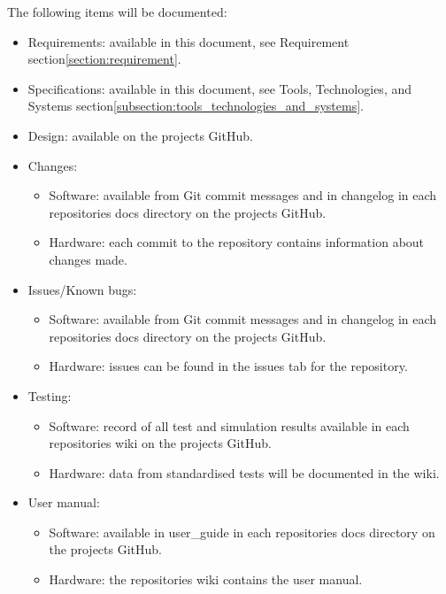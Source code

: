 The following items will be documented:
\begin{itemize}
    \item Requirements: available in this document, see Requirement section\:\ref{section:requirement}.
    \item Specifications: available in this document, see Tools, Technologies, and Systems section\:\ref{subsection:tools_technologies_and_systems}.
    \item Design: available on the projects GitHub.
    \item Changes:
    \begin{itemize}
        \item Software: available from Git commit messages and in changelog in each repositories docs directory on the projects GitHub.
        \item Hardware: each commit to the repository contains information about changes made.
    \end{itemize}
    \item Issues/Known bugs:
    \begin{itemize}
        \item Software: available from Git commit messages and in changelog in each repositories docs directory on the projects GitHub.
        \item Hardware: issues can be found in the issues tab for the repository.
    \end{itemize}
    \item Testing: 
    \begin{itemize}
        \item Software: record of all test and simulation results available in each repositories wiki on the projects GitHub.
        \item Hardware: data from standardised tests will be documented in the wiki.
    \end{itemize}
    \item User manual:
    \begin{itemize}
        \item Software: available in user\_guide in each repositories docs directory on the projects GitHub.
        \item Hardware: the repositories wiki contains the user manual.
    \end{itemize}
\end{itemize}

